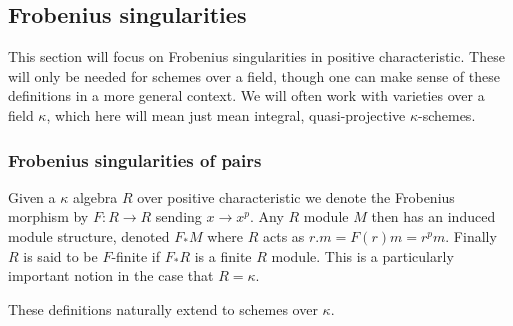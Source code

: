 %	

\subsection{Frobenius singularities}

This section will focus on Frobenius singularities in positive characteristic. These will only be needed for schemes over a field, though one can make sense of these definitions in a more general context. We will often work with varieties over a field $\kappa$, which here will mean just mean integral, quasi-projective $\kappa$-schemes.

\subsubsection{Frobenius singularities of pairs}

\begin{definition}
Given a $\kappa$ algebra $R$ over positive characteristic we denote the Frobenius morphism by $F\colon R\to R$ sending $x \to x^{p}$. Any $R$ module $M$ then has an induced module structure, denoted $F_{*}M$ where $R$ acts as $r.m=F(r)m=r^{p}m$. Finally $R$ is said to be $F$-finite if $F_{*}R$ is a finite $R$ module. This is a particularly important notion in the case that $R=\kappa$.

These definitions naturally extend to schemes over $\kappa$. 
\end{definition}

